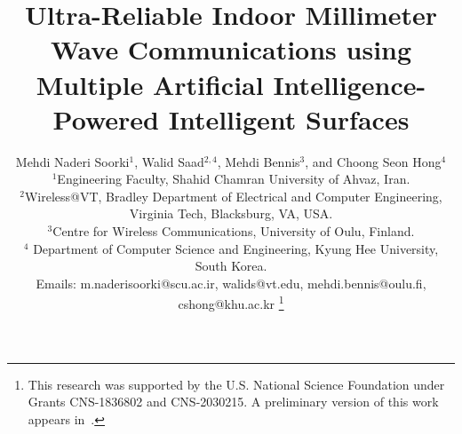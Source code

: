 \documentclass[conference]{IEEEtran}
\begin{document}
\clearpage
\title{\huge Ultra-Reliable Indoor Millimeter Wave Communications using Multiple Artificial Intelligence-Powered Intelligent Surfaces}
\author{Mehdi Naderi Soorki$^{1}$, Walid Saad$^{2,4}$, Mehdi Bennis$^{3}$, and Choong Seon Hong$^{4}$\vspace*{0.1cm}\\
\small {$^{1}$Engineering Faculty, Shahid Chamran University of Ahvaz, Iran.}\\
\small {$^{2}$Wireless@VT, Bradley Department of Electrical and Computer Engineering, Virginia Tech, Blacksburg, VA, USA.}\\
\small {$^{3}$Centre for Wireless Communications, University of Oulu, Finland.}\\
\small {$^{4}$ Department of Computer Science and Engineering, Kyung Hee University, South Korea.}\\
\small {Emails: m.naderisoorki@scu.ac.ir, walids@vt.edu, mehdi.bennis@oulu.fi, cshong@khu.ac.kr}
\vspace{-0.7cm}
  \thanks{This research was supported by the U.S. National Science Foundation under Grants CNS-1836802 and CNS-2030215. A preliminary version of this work appears in~\cite{Globecome2019}.}
}
\maketitle
\thispagestyle{empty}
\end{document}

